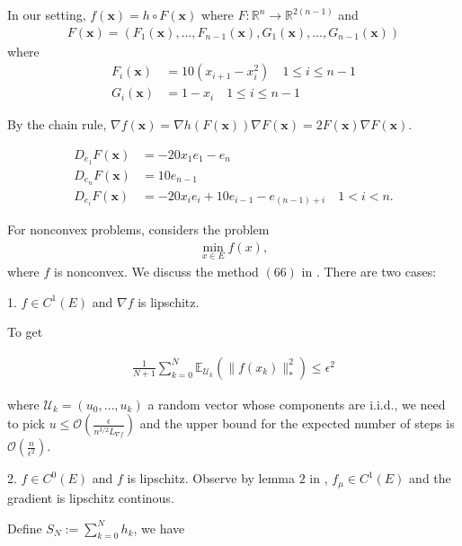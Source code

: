 \documentclass{article}
\begin{document}
In our setting, $f(\mathbf{x}) = h \circ F(\mathbf{x})$ where $F: \mathbb{R}^n \to \mathbb{R}^{2(n-1)}$ and 
\begin{align}
F(\mathbf{x}) = (F_1(\mathbf{x}), \dots, F_{n-1}(\mathbf{x}), G_1(\mathbf{x}), \dots, G_{n-1}(\mathbf{x}))
\end{align}
where 
\begin{align}
F_i(\mathbf{x}) & = 10(x_{i+1}-x_i^2) \quad 1 \leq i \leq n-1 \\ G_i(\mathbf{x}) & = 1 - x_i \quad 1 \leq i \leq n-1
\end{align}

By the chain rule, $\nabla f(\mathbf{x}) = \nabla h(F(\mathbf{x}))\nabla F(\mathbf{x}) = 2F(\mathbf{x}) \nabla F(\mathbf{x})$.

\begin{align}
D_{e_1}F(\mathbf{x}) & = -20x_1e_1 - e_n \\ D_{e_n}F(\mathbf{x}) & = 10e_{n-1} \\ D_{e_i}F(\mathbf{x}) & = -20x_ie_i + 10e_{i-1} - e_{(n-1) + i} \quad 1 < i < n.
\end{align}

For nonconvex problems, \cite{Nesterov2015} considers the problem 
\begin{align}
\min_{x \in E}f(x),
\end{align}
where $f$ is nonconvex. We discuss the method $(66)$ in \cite{Nesterov2015}. There are two cases: \newline 

1. $f \in C^1(E)$ and $\nabla f$ is lipschitz. \newline 

To get 

\begin{align}
\frac{1}{N+1}\sum_{k=0}^{N}\mathbb{E}_{\mathcal{U}_k}(\|f(x_k)\|_*^2) \leq \epsilon^2
\end{align}

where $\mathcal{U}_k = (u_0, \dots,u_k)$ a random vector whose components are i.i.d., we need to pick $u \leq \mathcal{O}\left(\frac{\epsilon}{n^{3/2}L_{\nabla f}}\right)$ and the upper bound for the expected number of steps is $\mathcal{O}\left(\frac{n}{\epsilon^2}\right)$. \newline 

2. $f \in C^0(E)$ and $f$ is lipschitz. Observe by lemma $2$ in \cite{Nesterov2015}, $f_{\mu} \in C^1(E)$ and the gradient is lipschitz continous. \newline 

Define $S_N:= \sum_{k=0}^Nh_k$, we have 
\end{document}
